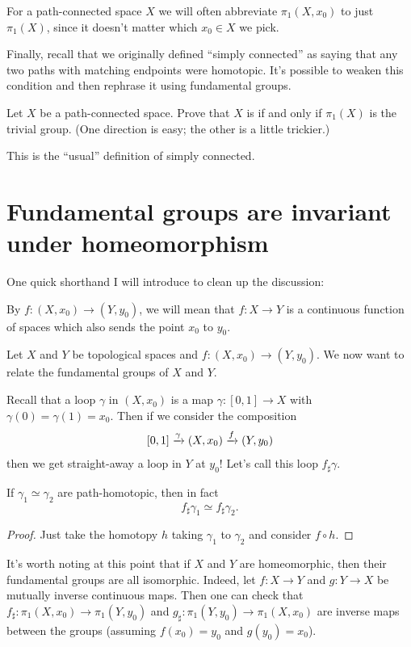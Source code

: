 \begin{abuse}
	For a path-connected space $X$ we will often abbreviate $\pi_1(X, x_0)$
	to just $\pi_1(X)$, since it doesn't matter which $x_0 \in X$
	we pick.
\end{abuse}

Finally, recall that we originally defined ``simply connected'' as saying
that any two paths with matching endpoints were homotopic.
It's possible to weaken this condition and then rephrase it using
fundamental groups.
\begin{exercise}
	Let $X$ be a path-connected space.
	Prove that $X$ is  if and only if
	$\pi_1(X)$ is the trivial group.
	(One direction is easy; the other is a little trickier.)
\end{exercise}
This is the ``usual'' definition of simply connected.


\section{Fundamental groups are invariant under homeomorphism}
One quick shorthand I will introduce to clean up the discussion:
\begin{definition}
	By $f \colon (X, x_0) \to (Y, y_0)$, we will mean that
	$f \colon X \to Y$ is a continuous function of spaces
	which also sends the point $x_0$ to $y_0$.
\end{definition}

Let $X$ and $Y$ be topological spaces and $f \colon (X, x_0) \to (Y, y_0)$.
We now want to relate the fundamental groups of $X$ and $Y$.

Recall that a loop $\gamma$ in $(X, x_0)$ is a map $\gamma \colon [0,1] \to X$
with $\gamma(0) = \gamma(1) = x_0$.
Then if we consider the composition
\[ [0,1] \xrightarrow{\gamma} (X, x_0) \xrightarrow{f} (Y, y_0) \]
then we get straight-away a loop in $Y$ at $y_0$!
Let's call this loop $f_\sharp \gamma$.
\begin{lemma}
	\label{lem:fsharp_homotopy_invariant}
	If $\gamma_1 \simeq \gamma_2$ are path-homotopic,
	then in fact
	\[ f_\sharp \gamma_1 \simeq f_\sharp \gamma_2. \]
\end{lemma}
\begin{proof}
	Just take the homotopy $h$ taking $\gamma_1$ to $\gamma_2$
	and consider $f \circ h$.
\end{proof}

It's worth noting at this point that if $X$ and $Y$ are homeomorphic,
then their fundamental groups are all isomorphic.
Indeed, let $f \colon X \to Y$ and $g \colon Y \to X$ be mutually inverse continuous maps.
Then one can check that $f_\sharp \colon \pi_1(X, x_0) \to \pi_1(Y, y_0)$
and $g_\sharp \colon \pi_1(Y, y_0) \to \pi_1(X, x_0)$ are inverse maps
between the groups (assuming $f(x_0) = y_0$ and $g(y_0) = x_0$).

